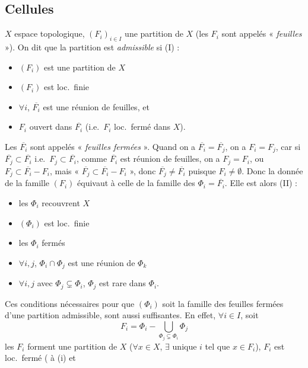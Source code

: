 \documentclass[11pt,a4paper]{article}
\begin{document}
\subsection*{Cellules}
$X$ espace topologique, $(F_i)_{i \in I}$ une partition de $X$ (les $F_i$
sont appelés « \emph{feuilles} »). On dit que la partition est
\emph{admissible} si (I) :
\begin{itemize}
  \item[(0)] $(F_i)$ est une partition de $X$
  \item[(i)] $(F_i)$ est loc.\ finie \struck{\ill{}}
  \item[(ii)] $\forall i$, $\overline{F_i}$ est une réunion de
  feuilles, et
  \item[(iii)] $F_i$ ouvert dans $\overline{F_i}$ (i.e.\ $F_i$ loc.\
  fermé dans $X$).
\end{itemize}
Les $\overline{F_i}$ sont appelés « \emph{feuilles fermées} ». Quand on a
$\overline{F_i} = \overline{F_j}$, on a $F_i = F_j$, car si
$\overline{F_j} \subset \overline{F_i}$ i.e.\ $F_j \subset \overline{F_i}$,
comme $\overline{F_i}$ est réunion de feuilles, on a $F_j = F_i$, ou $F_j
\subset \overline{F_i} - F_i$, mais \add{dans ce cas} \struck{\ill{}}
« $\overline{F_j} \subset \overline{F_i} - F_i$ », donc $\overline{F_j}
\neq \overline{F_i}$ puisque $F_i \neq \emptyset$. Donc la donnée de la
famille $(F_i)$ équivaut à celle de la famille des $\Phi_i =
\overline{F_i}$. Elle est alors  (II) :
\begin{itemize}
  \item[(0)] les $\Phi_i$ \struck{\ill{}} recouvrent $X$
  \item[(i)] $(\Phi_i)$ est loc.\ finie
  \item[(ii)] les $\Phi_i$ fermés
  \item[(iii)] $\forall i, j$, $\Phi_i \cap \Phi_j$ est une réunion
  de $\Phi_k$
  \item[(iv)] $\forall i, j$ avec $\Phi_j \subsetneq \Phi_i$,
  \struck{\ill{}} $\Phi_j$ est rare dans $\Phi_i$.
\end{itemize}
Ces conditions nécessaires pour que $(\Phi_i)$ soit la famille des feuilles
fermées d'une partition admissible, sont aussi suffisantes. En effet,
$\forall i \in I$, soit
\[
  F_i = \Phi_i - \bigcup_{\Phi_j \subsetneq \Phi_i} \Phi_j
\]
les $F_i$ forment une partition de $X$ ($\forall x \in X$, $\exists$ unique
$i$ tel que $x \in F_i$), $F_i$ est loc.\ fermé (\uncertain{grâce} à (i) et
\end{document}
